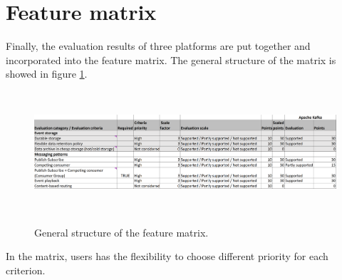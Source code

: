 \section{Feature matrix} 
Finally, the evaluation results of three platforms are put together and incorporated into the feature matrix. The general structure of the matrix is showed in figure \ref{fig:featurematrix}.

\begin{figure}[h]
	\begin{adjustwidth}{-1.5cm}{}
	\centering
	\includegraphics[width=18cm,height=4.5cm]{images/feature-matrix.png}
	\label{fig:featurematrix}
	\end{adjustwidth}
	\caption{General structure of the feature matrix.}
\end{figure}

In the matrix, users has the flexibility to choose different priority for each criterion. 